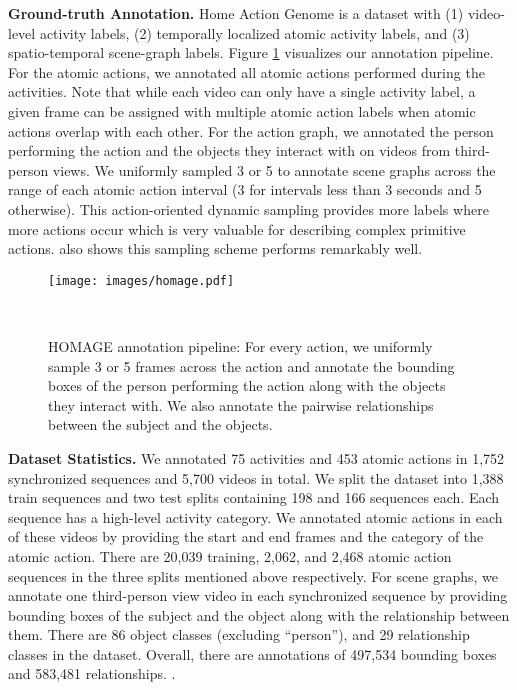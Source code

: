 \documentclass[final]{cvpr}
\begin{document}
\noindent\textbf{Ground-truth Annotation.}
Home Action Genome is a dataset with (1) video-level activity labels, (2) temporally localized atomic activity labels, and (3) spatio-temporal scene-graph labels. Figure \ref{fig:anno_pipeline} visualizes our annotation pipeline. 
For the atomic actions, we annotated all atomic actions performed during the activities. Note that while each video can only have a single activity label, a given frame can be assigned with multiple atomic action labels when atomic actions overlap with each other. For the action graph, we annotated the person performing the action and the objects they interact with on videos from third-person views.
We uniformly sampled 3 or 5 to annotate scene graphs across the range of each atomic action interval (3 for intervals less than 3 seconds and 5 otherwise). This action-oriented dynamic sampling provides more labels where more actions occur which is very valuable for describing complex primitive actions. \cite{ji2020action} also shows this sampling scheme performs remarkably well.

\begin{figure}[t]
    \begin{center}
    \texttt{[image: images/homage.pdf]}
    \vspace{-20pt}
    \caption{\small HOMAGE annotation pipeline: For every action, we uniformly sample 3 or 5 frames across the action and annotate the bounding boxes of the person performing the action along with the objects they interact with. We also annotate the pairwise relationships between the subject and the objects. \label{fig:anno_pipeline}}
    \vspace{-30pt}
\    \end{center}
\end{figure}

\noindent\textbf{Dataset Statistics.}
We annotated 75 activities and 453 atomic actions in 1,752 synchronized sequences and 5,700 videos in total. We split the dataset into 1,388 train sequences and two test splits containing 198 and 166 sequences each. Each sequence has a high-level activity category.
We annotated atomic actions in each of these videos by providing the start and end frames and the category of the atomic action. There are 20,039 training, 2,062, and 2,468 atomic action sequences in the three splits mentioned above respectively.
For scene graphs, we annotate one third-person view video in each synchronized sequence by providing bounding boxes of the subject and the object along with the relationship between them. There are 86 object classes (excluding ``person''), and 29 relationship classes in the dataset. Overall, there are annotations of 497,534 bounding boxes and 583,481 relationships. .
\end{document}
